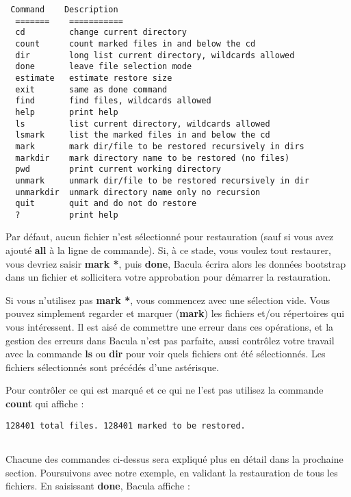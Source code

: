 \footnotesize
\begin{verbatim}
 Command    Description
  =======    ===========
  cd         change current directory
  count      count marked files in and below the cd
  dir        long list current directory, wildcards allowed
  done       leave file selection mode
  estimate   estimate restore size
  exit       same as done command
  find       find files, wildcards allowed
  help       print help
  ls         list current directory, wildcards allowed
  lsmark     list the marked files in and below the cd
  mark       mark dir/file to be restored recursively in dirs
  markdir    mark directory name to be restored (no files)
  pwd        print current working directory
  unmark     unmark dir/file to be restored recursively in dir
  unmarkdir  unmark directory name only no recursion
  quit       quit and do not do restore
  ?          print help
\end{verbatim}
\normalsize

Par d\'efaut, aucun fichier n'est s\'electionn\'e pour restauration (sauf si vous  
avez ajout\'e {\bf all} \`a la ligne de commande). Si, \`a ce stade, vous voulez 
tout restaurer, vous devriez saisir {\bf mark *}, puis {\bf done}, Bacula 
\'ecrira alors les donn\'ees bootstrap dans un fichier et sollicitera votre 
approbation pour d\'emarrer la restauration.

Si vous n'utilisez pas {\bf mark *}, vous commencez avec une s\'election vide. 
Vous pouvez simplement regarder et marquer ({\bf mark}) les fichiers et/ou 
r\'epertoires qui vous int\'eressent. Il est ais\'e de commettre une erreur dans ces 
op\'erations, et la gestion des erreurs dans Bacula n'est pas parfaite, aussi 
contr\^olez votre travail avec la commande {\bf ls} ou {\bf dir} pour voir 
quels fichiers ont \'et\'e s\'electionn\'es. Les fichiers s\'electionn\'es sont pr\'ec\'ed\'es 
d'une ast\'erisque.

Pour contr\^oler ce qui est marqu\'e et ce qui ne l'est pas utilisez la commande 
{\bf count} qui affiche :

\footnotesize
\begin{verbatim}
128401 total files. 128401 marked to be restored.
     
\end{verbatim}
\normalsize

Chacune des commandes ci-dessus sera expliqu\'e plus en d\'etail dans la 
prochaine section. Poursuivons avec notre exemple, en validant la restauration de 
tous les fichiers. En saisissant {\bf done}, Bacula affiche :

